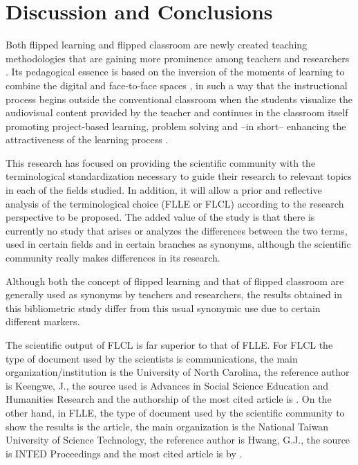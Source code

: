 \documentclass{textolivre}
\begin{document}
\section{Discussion and Conclusions}\label{sec-discussion}
Both flipped learning and flipped classroom are newly created teaching methodologies that are gaining more prominence among teachers and researchers \cite{hinojo-lucena_incidence_2018}. Its pedagogical essence is based on the inversion of the moments of learning to combine the digital and face-to-face spaces \cite{lee_development_2017}, in such a way that the instructional process begins outside the conventional classroom \cite{borao_moreno_alisis_2016} when the students visualize the audiovisual content provided by the teacher \cite{el_miedany_flipped_2019,long_use_2017} and continues in the classroom itself promoting project-based learning, problem solving and –in short– enhancing the attractiveness of the learning process \cite{kostaris_investigating_2017}.

This research has focused on providing the scientific community with the terminological standardization necessary to guide their research to relevant topics in each of the fields studied. In addition, it will allow a prior and reflective analysis of the terminological choice (FLLE or FLCL) according to the research perspective to be proposed. The added value of the study is that there is currently no study that arises or analyzes the differences between the two terms, used in certain fields and in certain branches as synonyms, although the scientific community really makes differences in its research.

Although both the concept of flipped learning and that of flipped classroom are generally used as synonyms by teachers and researchers, the results obtained in this bibliometric study differ from this usual synonymic use due to certain different markers. 

The scientific output of FLCL is far superior to that of FLLE. For FLCL the type of document used by the scientists is communications, the main organization/institution is the University of North Carolina, the reference author is Keengwe, J., the source used is Advances in Social Science Education and Humanities Research and the authorship of the most cited article is \textcite{mclaughlin_flipped_2014}. On the other hand, in FLLE, the type of document used by the scientific community to show the results is the article, the main organization is the National Taiwan University of Science Technology, the reference author is Hwang, G.J., the source is INTED Proceedings and the most cited article is by \textcite{chen_is_2014}.
\end{document}
